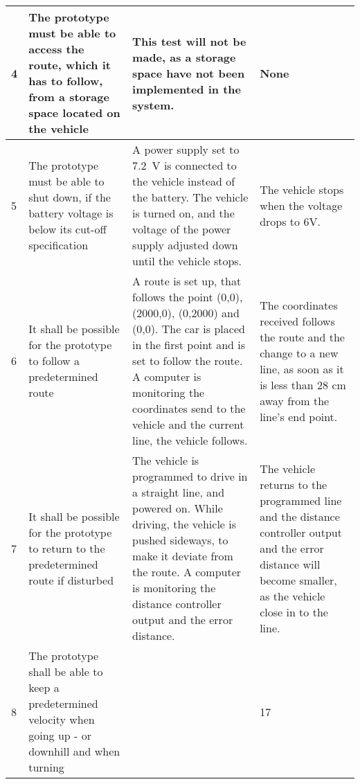 \begin{table}[H]
\begin{tabular}{|p{2cm}|p{5cm}|p{6cm}|p{3cm}|}
\hline%
           4    &   The prototype must be able to access the route, which it has to follow, from a storage space located on the vehicle & This test will not be made, as a storage space have not been implemented in the system.   & None                 \\
\hline%
           5    &   The prototype must be able to shut down, if the battery voltage is below its cut-off specification &   A power supply set to \SI{7,2}{V} is connected to the vehicle instead of the battery. The vehicle is turned on, and the voltage of the power supply adjusted down until the vehicle stops.   &   The vehicle stops when the voltage drops to 6V.               \\
\hline%
           6    &   It shall be possible for the prototype to follow a predetermined route &   A route is set up, that follows the point (0,0), (2000,0), (0,2000) and (0,0). The car is placed in the first point and is set to follow the route. A computer is monitoring the coordinates send to the vehicle and the current line, the vehicle follows.  &  The coordinates received follows the route and the change to a new line, as soon as it is less than 28 cm away from the line's end point.           \\
\hline%
           7    &   It shall be possible for the prototype to return to the predetermined route if disturbed   &  The vehicle is programmed to drive in a straight line, and powered on. While driving, the vehicle is pushed sideways, to make it deviate from the route. A computer is monitoring the distance controller output and the error distance.    &   The vehicle returns to the programmed line and the distance controller output and the error distance will become smaller, as the vehicle close in to the line.            \\ 
\hline%
           8    &   The prototype shall be able to keep a predetermined velocity when going up - or downhill and when turning   &     &    17             \\
\hline%
\end{tabular}
\label{tab:AcceptTestTestProcedure}
\end{table}

